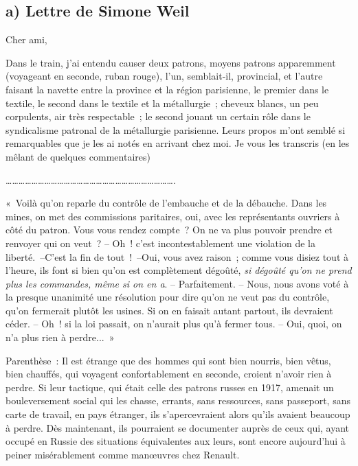 \documentclass[french,twoside]{book} %
\begin{document}
\subsection[a) Lettre de Simone Weil ]{a) Lettre de Simone Weil \protect\footnotemark }
\noindent Cher ami,\par
Dans le train, j'ai entendu causer deux patrons, moyens patrons apparemment (voyageant en seconde, ruban rouge), l'un, semblait-il, provincial, et l'autre faisant la navette entre la province et la région parisienne, le premier dans le textile, le second dans le textile et la métallurgie ; cheveux blancs, un peu corpulents, air très respectable ; le second jouant un certain rôle dans le syndicalisme patronal de la métallurgie parisienne. Leurs propos m'ont semblé si remarquables que je les ai notés en arrivant chez moi. Je vous les transcris (en les mêlant de quelques commentaires)\par
…………………………………………………………………….\par
« Voilà qu'on reparle du contrôle de l'embauche et de la débauche. Dans les mines, on met des commissions paritaires, oui, avec les représentants ouvriers à côté du patron. Vous vous rendez compte ? On ne va plus pouvoir prendre et renvoyer qui on veut ? – Oh ! c'est incontestablement une violation de la liberté. –C'est la fin de tout ! –Oui, vous avez raison ; comme vous disiez tout à l'heure, ils font si bien qu'on est complètement dégoûté, {\itshape si dégoûté qu'on ne prend plus les commandes, même si on en a}. – Parfaitement. – Nous, nous avons voté à la presque unanimité une résolution pour dire qu'on ne veut pas du contrôle, qu'on fermerait plutôt les usines. Si on en faisait autant partout, ils devraient céder. – Oh ! si la loi passait, on n'aurait plus qu'à fermer tous. – Oui, quoi, on n'a plus rien à perdre... »\par
Parenthèse : Il est étrange que des hommes qui sont bien nourris, bien vêtus, bien chauffés, qui voyagent confortablement en seconde, croient n'avoir rien à perdre. Si leur tactique, qui était celle des patrons russes en 1917, amenait un bouleversement social qui les chasse, errants, sans ressources, sans passeport, sans carte de travail, en pays étranger, ils s'apercevraient alors qu'ils avaient beaucoup à perdre. Dès maintenant, ils pourraient se documenter auprès de ceux qui, ayant occupé en Russie des situations équivalentes aux leurs, sont encore aujourd'hui à peiner misérablement comme manœuvres chez Renault.\par
\end{document}
